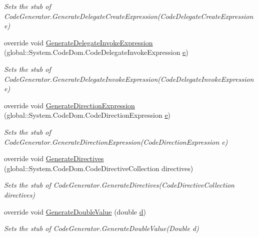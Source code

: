 \begin{DoxyCompactItemize}
\begin{DoxyCompactList}\small\item\em Sets the stub of Code\-Generator.\-Generate\-Delegate\-Create\-Expression(\-Code\-Delegate\-Create\-Expression e)\end{DoxyCompactList}\item 
override void \hyperlink{class_system_1_1_code_dom_1_1_compiler_1_1_fakes_1_1_stub_code_compiler_a4de9e25742674bb03c4c13e8c3902267}{Generate\-Delegate\-Invoke\-Expression} (global\-::\-System.\-Code\-Dom.\-Code\-Delegate\-Invoke\-Expression \hyperlink{jquery-1_810_82_8min_8js_a2c038346d47955cbe2cb91e338edd7e1}{e})
\begin{DoxyCompactList}\small\item\em Sets the stub of Code\-Generator.\-Generate\-Delegate\-Invoke\-Expression(\-Code\-Delegate\-Invoke\-Expression e)\end{DoxyCompactList}\item 
override void \hyperlink{class_system_1_1_code_dom_1_1_compiler_1_1_fakes_1_1_stub_code_compiler_a648644ce4473e12b1e8f1719a69d1e4d}{Generate\-Direction\-Expression} (global\-::\-System.\-Code\-Dom.\-Code\-Direction\-Expression \hyperlink{jquery-1_810_82_8min_8js_a2c038346d47955cbe2cb91e338edd7e1}{e})
\begin{DoxyCompactList}\small\item\em Sets the stub of Code\-Generator.\-Generate\-Direction\-Expression(\-Code\-Direction\-Expression e)\end{DoxyCompactList}\item 
override void \hyperlink{class_system_1_1_code_dom_1_1_compiler_1_1_fakes_1_1_stub_code_compiler_a221c65cd79ea1dace9f900a668cb4418}{Generate\-Directives} (global\-::\-System.\-Code\-Dom.\-Code\-Directive\-Collection directives)
\begin{DoxyCompactList}\small\item\em Sets the stub of Code\-Generator.\-Generate\-Directives(\-Code\-Directive\-Collection directives)\end{DoxyCompactList}\item 
override void \hyperlink{class_system_1_1_code_dom_1_1_compiler_1_1_fakes_1_1_stub_code_compiler_afd90a9dc228268293ccaa432cbf02945}{Generate\-Double\-Value} (double \hyperlink{bootstrap_8min_8js_aeb337d295abaddb5ec3cb34cc2e2bbc9}{d})
\begin{DoxyCompactList}\small\item\em Sets the stub of Code\-Generator.\-Generate\-Double\-Value(\-Double d)\end{DoxyCompactList}\item 

\end{DoxyCompactItemize}
